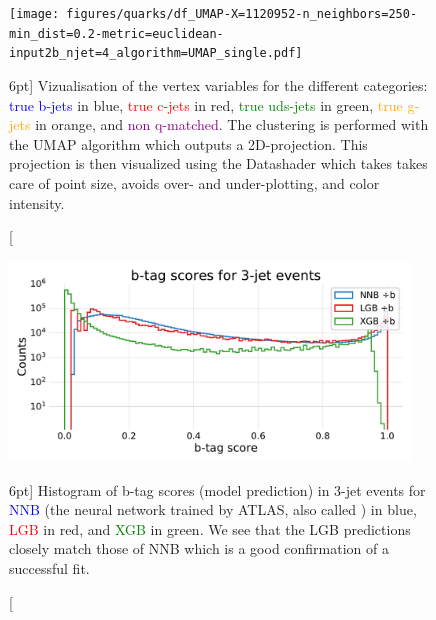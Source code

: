 \documentclass[a4paper, twoside]{tufte-book}
\newcommand{\code}[1]{\colorbox{light-gray}{\texttt{\detokenize{#1}}}}
\begin{document}
\begin{figure}
  \texttt{[image: figures/quarks/df\_UMAP-X=1120952-n\_neighbors=250-min\_dist=0.2-metric=euclidean-input2b\_njet=4\_algorithm=UMAP\_single.pdf]}
  \caption[UMAP vizualisation of vertex variables][6pt]
          {Vizualisation of the vertex variables for the different categories: \textcolor{blue}{true b-jets} in blue, \textcolor{red}{true c-jets} in red, \textcolor{green}{true uds-jets} in green, \textcolor{orange}{true g-jets} in orange, and \textcolor{purple}{non q-matched}. The clustering is performed with the UMAP algorithm which outputs a 2D-projection. This projection is then visualized using the Datashader which takes takes care of point size, avoids over- and under-plotting, and color intensity. 
          } 
  \label{fig:q:UMAP_vertex}
\end{figure}



\begin{figure}
  \includegraphics[width=0.95\textwidth, trim=0 0 0 30, clip]{figures/quarks/y_pred_3_jet_hist-down_sample=1.00-ML_vars=vertex-selection=b-ejet_min=4-n_iter_RS_lgb=99-n_iter_RS_xgb=9-cdot_cut=0.90-version=19.pdf}
  \caption[b-tag scores in 3-jet events][6pt]
          {Histogram of b-tag scores (model prediction) in 3-jet events for \textcolor{blue}{NNB} (the neural network trained by ATLAS, also called \code{nnbjet}) in blue, \textcolor{red}{LGB} in red, and \textcolor{green}{XGB} in green. We see that the LGB predictions closely match those of NNB which is a good confirmation of a successful fit.  
          } 
  \label{fig:q:btag_scores_3j}
\end{figure}
\end{document}
